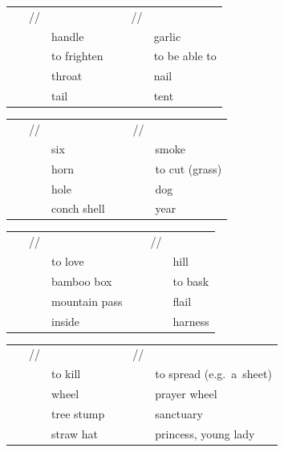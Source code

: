 \Hack{\newpage}

			\begin{exe}
				\ex \label{ex:velaranduvularstops}
				\begin{xlist}
					\extab
					\begin{tabularx}{112mm}{ P{14mm} P{27mm} P{15mm} Q }
						~~~// &  & ~~~// &\\
						 & handle &  & garlic\\ 
						 & to frighten &  & to be able to\\ 
						 & throat &  & nail\\ 
						 & tail &  & tent\\
					\end{tabularx}
					
					\Hack{\vspace*{.5\baselineskip}}  
					\extab
					\begin{tabularx}{112mm}{ P{14mm} P{27mm} P{15mm} Q }
						~~~// &  & ~~~// &\\
						 & six &  & smoke\\ 
						 & horn &  & to cut (grass)\\ 
						 & hole &  & dog\\ 
						 & conch shell &  & year\\
					\end{tabularx}
					
					\Hack{\vspace*{.5\baselineskip}}
					\extab
					\begin{tabularx}{112mm}{ P{14mm} P{27mm} P{15mm} Q }
						~~~// &  & ~~~// &\\
						 & to love &  & hill\\ 
						 & bamboo box &  & to bask\\ 
						 & mountain pass &  & flail\\ 
						 & inside &  & harness\\
					\end{tabularx}
					
					\Hack{\vspace*{.5\baselineskip}}
					\extab
					\begin{tabularx}{112mm}{ P{14mm} P{27mm} P{15mm} Q }
						~~~// &  & ~~~// &\\
						 & to kill &  & to spread (e.g.~a~sheet)\\ 
						 & wheel &  & prayer wheel\\ 
						 & tree stump &  & sanctuary\\ 
						 & straw hat &  & princess, young lady\\
					\end{tabularx}
					

\end{xlist}
\end{exe}
